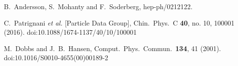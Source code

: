 \documentclass[11pt]{article}
\begin{document}
\begin{thebibliography}{10}
  B.~Andersson, S.~Mohanty and F.~Soderberg,
  hep-ph/0212122.

  C.~Patrignani {\it et al.} [Particle Data Group],
  Chin.\ Phys.\ C {\bf 40}, no. 10, 100001 (2016).
  doi:10.1088/1674-1137/40/10/100001

  M.~Dobbs and J.~B.~Hansen,
  Comput.\ Phys.\ Commun.\  {\bf 134}, 41 (2001).
  doi:10.1016/S0010-4655(00)00189-2


\end{thebibliography}
\end{document}
